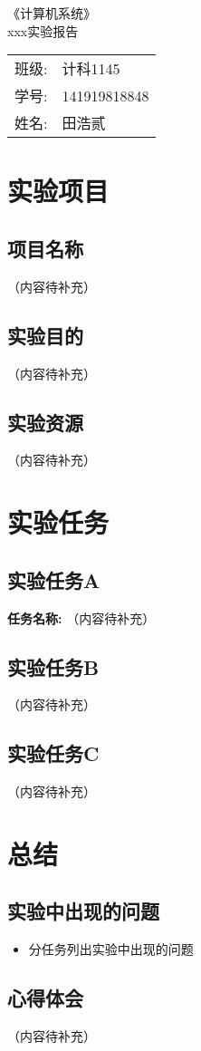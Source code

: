 \documentclass[a4paper, 11pt]{ctexart}
\let\oldsection\section
\renewcommand{\section}{\clearpage\oldsection}
\begin{document}
\begin{titlepage}
    \begin{center}
        \vspace*{5cm}
        \yahei{}《计算机系统》\\ \vspace{50pt}xxx实验报告
        \vfill
        \begin{tabular}{ll}
            班级: & 计科1145\\
            学号: & 141919818848\\
            姓名: & 田浩贰\\
        \end{tabular} 
    \end{center}
\end{titlepage}
\setcounter{page}{2}

\renewcommand{\contentsname}{\centering 目录}
\tableofcontents

\section{实验项目}
\setcounter{subsection}{0}
\subsection{项目名称}
（内容待补充）

\subsection{实验目的}
（内容待补充）

\subsection{实验资源}
（内容待补充）

\section{实验任务}
\subsection{实验任务A}
\textbf{任务名称:} 
（内容待补充）

\subsection{实验任务B}
（内容待补充）

\subsection{实验任务C}
（内容待补充）

\section{总结}
\subsection{实验中出现的问题}
\begin{itemize}
    \item 分任务列出实验中出现的问题
\end{itemize}

\subsection{心得体会}
（内容待补充）
\end{document}
